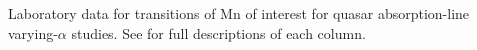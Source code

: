 Laboratory data for transitions of Mn of interest for quasar absorption-line varying-$\alpha$ studies. See  for full descriptions of each column.
